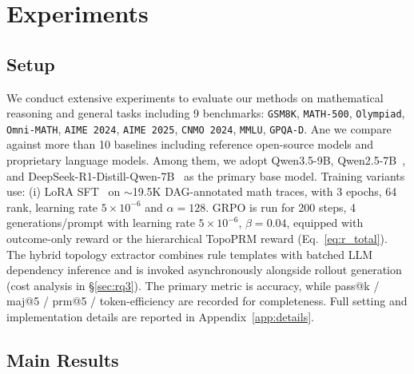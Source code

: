 \section{Experiments}
\label{sec:experiments}

\subsection{Setup}
\label{sec:setup}
We conduct extensive experiments to evaluate our methods on mathematical reasoning and general tasks including 9 benchmarks: \texttt{GSM8K}, \texttt{MATH-500}, \texttt{Olympiad}, \texttt{Omni-MATH}, \texttt{AIME 2024}, \texttt{AIME 2025}, \texttt{CNMO 2024}, \texttt{MMLU}, \texttt{GPQA-D}. Ane we compare against more than 10 baselines including reference open-source models and proprietary language models.
Among them, we adopt Qwen3.5-9B, Qwen2.5-7B~\citep{yang2024qwen2_5}, and DeepSeek-R1-Distill-Qwen-7B~\citep{deepseekr1} as the primary base model. 
Training variants use: (i) LoRA SFT~\citep{vonwerra2022trl,hu2022lora} on $\sim$19.5K DAG-annotated math traces, with 3 epochs, 64 rank, learning rate $5{\times}10^{-6}$ and $\alpha{=}128$.
GRPO is run for 200 steps, 4 generations/prompt with learning rate $5{\times}10^{-6}$, $\beta{=}0.04$, equipped with outcome-only reward or the hierarchical TopoPRM reward (Eq.~\ref{eq:r_total}).
The hybrid topology extractor combines rule templates with batched LLM dependency inference and is invoked asynchronously alongside rollout generation (cost analysis in §\ref{sec:rq3}).
The primary metric is accuracy, while pass@k / maj@5 / prm@5 / token-efficiency are recorded for completeness. Full setting and implementation details are reported in Appendix~\ref{app:details}.

\subsection{Main Results}
\label{sec:rq1}

% 




